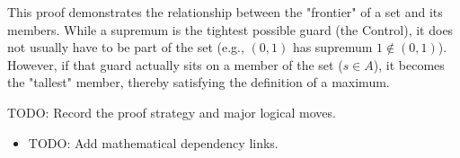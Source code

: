 \begin{remark*}[Interpretation]
This proof demonstrates the relationship between the "frontier" of a set and its members. While a supremum is the tightest possible guard (the Control), it does not usually have to be part of the set (e.g., $(0, 1)$ has supremum $1 \notin (0,1)$). However, if that guard actually sits on a member of the set ($s \in A$), it becomes the "tallest" member, thereby satisfying the definition of a maximum.
\end{remark*}

\begin{remark*}
TODO: Record the proof strategy and major logical moves.
\end{remark*}

\begin{dependencies}
\begin{itemize}
  \item TODO: Add mathematical dependency links.
\end{itemize}
\end{dependencies}

\clearpage
